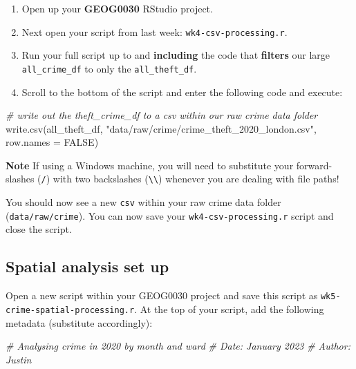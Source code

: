 \documentclass[
]{book}
\newenvironment{Shaded}{\begin{snugshade}}{\end{snugshade}}
\newcommand{\AttributeTok}[1]{\textcolor[rgb]{0.77,0.63,0.00}{#1}}
\newcommand{\CommentTok}[1]{\textcolor[rgb]{0.56,0.35,0.01}{\textit{#1}}}
\newcommand{\ConstantTok}[1]{\textcolor[rgb]{0.00,0.00,0.00}{#1}}
\newcommand{\FunctionTok}[1]{\textcolor[rgb]{0.00,0.00,0.00}{#1}}
\newcommand{\NormalTok}[1]{#1}
\newcommand{\StringTok}[1]{\textcolor[rgb]{0.31,0.60,0.02}{#1}}
\providecommand{\tightlist}{%
  \setlength{\itemsep}{0pt}\setlength{\parskip}{0pt}}
\begin{document}
\begin{enumerate}
\def\labelenumi{\arabic{enumi}.}
\tightlist
\item
  Open up your \textbf{GEOG0030} RStudio project.
\item
  Next open your script from last week: \texttt{wk4-csv-processing.r}.
\item
  Run your full script up to and \textbf{including} the code that \textbf{filters} our large \texttt{all\_crime\_df} to only the \texttt{all\_theft\_df}.
\item
  Scroll to the bottom of the script and enter the following code and execute:
\end{enumerate}

\begin{Shaded}
\begin{Highlighting}[]
\CommentTok{\# write out the theft\_crime\_df to a csv within our raw crime data folder}
\FunctionTok{write.csv}\NormalTok{(all\_theft\_df, }\StringTok{"data/raw/crime/crime\_theft\_2020\_london.csv"}\NormalTok{, }\AttributeTok{row.names =} \ConstantTok{FALSE}\NormalTok{)}
\end{Highlighting}
\end{Shaded}

\textbf{Note}
If using a Windows machine, you will need to substitute your forward-slashes (\texttt{/}) with two backslashes (\texttt{\textbackslash{}\textbackslash{}}) whenever you are dealing with file paths!

You should now see a new \texttt{csv} within your raw crime data folder (\texttt{data/raw/crime}). You can now save your \texttt{wk4-csv-processing.r} script and close the script.

\hypertarget{spatial-analysis-set-up}{%
\subsection{Spatial analysis set up}\label{spatial-analysis-set-up}}

Open a new script within your GEOG0030 project and save this script as \texttt{wk5-crime-spatial-processing.r}. At the top of your script, add the following metadata (substitute accordingly):

\begin{Shaded}
\begin{Highlighting}[]
\CommentTok{\# Analysing crime in 2020 by month and ward}
\CommentTok{\# Date: January 2023}
\CommentTok{\# Author: Justin }
\end{Highlighting}
\end{Shaded}
\end{document}

